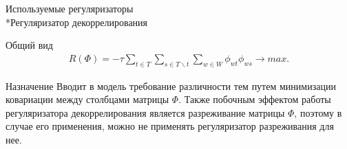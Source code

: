 \documentclass{beamer}
\begin{document}
\begin{frame}{Используемые регуляризаторы \\*Регуляризатор декоррелирования}
\begin{block}{Общий вид}
\begin{align*}
R(\Phi)=-\tau \sum_{t \in T}\sum_{s \in T\backslash t}\sum_{w \in W} \phi_{wt}\phi_{ws} \to max.
\end{align*} 
    \end{block}
\begin{block}{Назначение}
Вводит в модель требование различности тем путем минимизации ковариации между столбцами матрицы $\Phi$. Также побочным эффектом работы регуляризатора декоррелирования является разреживание матрицы $\Phi$, поэтому в случае его применения, можно не применять регуляризатор разреживания для нее.
    \end{block}
\end{frame}
\end{document}
